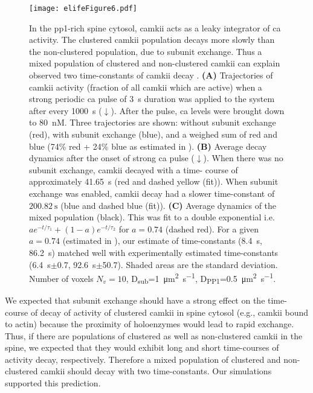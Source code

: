 \documentclass[9pt,lineno,doublespacing]{elife}
\newcommand\SUB[2]{#1\textsubscript{#2}}
\begin{document}
\begin{figure}%
    \texttt{[image: elifeFigure6.pdf]}
    \caption{ In the \gls{pp1}-rich spine cytosol, \gls{camkii} acts as a leaky integrator of \gls{ca} 
        activity. The clustered \gls{camkii} population decays more
	slowly than the non-clustered population, due to subunit exchange. 
	Thus a mixed population of clustered and non-clustered \gls{camkii}
        can explain observed two time-constants of \gls{camkii} decay \citep{chang_camkii_2017}.
        \textbf{(A)} Trajectories of \gls{camkii} activity (fraction of all
        \gls{camkii} which are active) when a strong periodic \gls{ca} pulse of \SI{3}{\second}
        duration was applied to the system after every \SI{1000}{\second} ($\downarrow$).
        After the pulse, \gls{ca} levels were brought down to \SI{80}{\nano M}. 
        Three trajectories are shown: without subunit exchange (red), with
        subunit exchange (blue), and a weighed sum of red and blue (74\%
        red + 24\% blue as estimated in \citep{chang_camkii_2017}). 
        \textbf{(B)} Average decay dynamics after the onset of strong \gls{ca} pulse ($\downarrow$). 
        When there was no subunit exchange, \gls{camkii} decayed with a time-
	course of approximately \SI{41.65}{\second} (red and dashed yellow (fit)). 
	When subunit exchange was enabled, \gls{camkii} decay had a slower time-constant 
        of $\SI{200.82}{\second}$ (blue and dashed blue (fit)). 
        \textbf{(C)} Average dynamics of the 
	mixed population (black). This was fit to a double
        exponential i.e. $ae^{-t/\tau_{1}}+(1-a)e^{-t/\tau_{2}}$ for
        $a=0.74$ (dashed red). 
        For a given $a=0.74$ (estimated in \citep{chang_camkii_2017}), our
        estimate of time-constants (\SI{8.4}{\second}, \SI{86.2}{\second}) 
	matched well with experimentally
        estimated time-constants (\SI{6.4}{\second}$\pm$0.7, \SI{92.6}{\second}$\pm$50.7). 
        Shaded areas are the standard deviation. Number of voxels $N_{v}=10$,
        \SUB{D}{sub}=\SI{1}{\micro\meter\squared\per\second},
        \SUB{D}{PP1}=\SI{0.5}{\micro\meter\squared\per\second}.
    }\label{fig:cytosol_integrator}
\end{figure}

We expected that subunit exchange should have a strong effect on the 
time-course of decay of activity of
clustered \gls{camkii} in spine cytosol (e.g., \gls{camkii} bound to actin)
because the proximity of holoenzymes would lead to rapid exchange. Thus, if
there are populations of clustered as well as non-clustered \gls{camkii} in the
spine, we expected that they would exhibit long and short time-courses of
activity decay, respectively. Therefore a mixed population of clustered and
non-clustered \gls{camkii} should decay with two time-constants. Our
simulations supported this prediction. 
\end{document}
